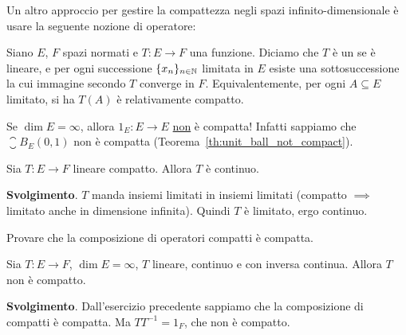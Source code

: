 Un altro approccio per gestire la compattezza negli spazi infinito-dimensionale è usare la seguente nozione di operatore:

\begin{definition}
	Siano $E$, $F$ spazi normati e $T:E \to F$ una funzione.
	Diciamo che $T$ è un  se è lineare, e per ogni successione $\{x_n\}_{n \in \mathbb{N}}$ limitata in $E$ esiste una sottosuccessione la cui immagine secondo $T$ converge in $F$. Equivalentemente, per ogni $A \subseteq E$ limitato, si ha $T(A)$ è relativamente compatto.
\end{definition}

\begin{example}
	Se $\dim E = \infty$, allora $1_E : E \to E$ \underline{non} è compatta! Infatti sappiamo che $\closure{B}_E(0,1)$ non è compatta (Teorema~\ref{th:unit_ball_not_compact}).
\end{example}

\begin{exercise}
	Sia $T:E \to F$ lineare compatto. Allora $T$ è continuo.

	\textbf{Svolgimento}. $T$ manda insiemi limitati in insiemi limitati (compatto $\implies$ limitato anche in dimensione infinita). Quindi $T$ è limitato, ergo continuo.
\end{exercise}

\begin{exercise}
	Provare che la composizione di operatori compatti è compatta.
\end{exercise}

\begin{exercise}
	Sia $T:E \to F$, $\dim E = \infty$, $T$ lineare, continuo e con inversa continua.
	Allora $T$ non è compatto.

	\textbf{Svolgimento}. Dall'esercizio precedente sappiamo che la composizione di compatti è compatta. Ma $TT^{-1} = 1_F$, che non è compatto.
\end{exercise}


